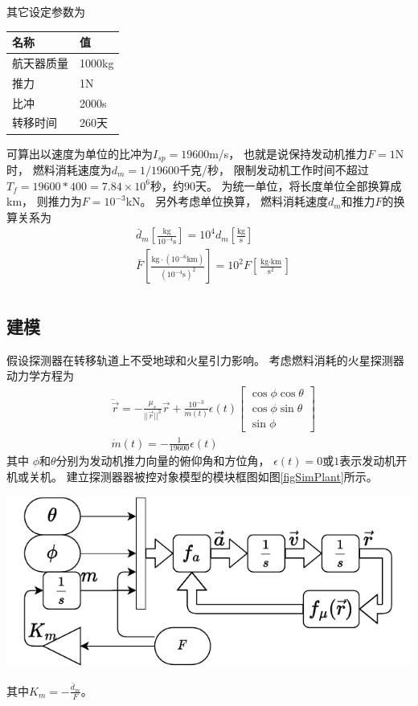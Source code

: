 其它设定参数为
\begin{center}\begin{tabular}{ll}
    \toprule
    名称 & 值 \\
    \midrule
    航天器质量 & 1000kg \\
    推力 & 1N \\
    比冲 & 2000s \\
    转移时间 & 260天 \\
    \bottomrule
\end{tabular}\end{center}
可算出以速度为单位的比冲为$I_{sp}=19600$m/s，
也就是说保持发动机推力$F=1$N时，
燃料消耗速度为$d_m=1/19600$千克/秒，
限制发动机工作时间不超过$T_f=19600*400=7.84\times10^6$秒，约90天。
为统一单位，将长度单位全部换算成km，
则推力为$F=10^{-3}$kN。
另外考虑单位换算，
燃料消耗速度$d_m$和推力$F$的换算关系为
\begin{align*}
    &\bar{d}_m\left[\frac{\text{kg}}{10^{-4}\text{s}}\right]
    = 10^4d_m\left[\frac{\text{kg}}{\text{s}}\right] \\
    &\bar{F}\left[\frac{\text{kg}\cdot(10^{-6}\text{km})}{(10^{-4}\text{s})^2}\right]
    = 10^2F\left[\frac{\text{kg}\cdot\text{km}}{\text{s}^2}\right] \\
\end{align*}

\subsection{建模}
假设探测器在转移轨道上不受地球和火星引力影响。
考虑燃料消耗的火星探测器动力学方程为
\begin{align*}
    &\ddot{\vec{r}} = -\frac{\mu_s}{||\vec{r}||^3}\vec{r}
    + \frac{10^{-3}}{m(t)}\epsilon(t)
    \left[\begin{matrix}
        \cos\phi\cos\theta \\ \cos\phi\sin\theta \\ \sin\phi
    \end{matrix}\right] \\
    &\dot{m}(t) = -\frac{1}{19600}\epsilon(t)
\end{align*}
其中
$\phi$和$\theta$分别为发动机推力向量的俯仰角和方位角，
$\epsilon(t)=0$或$1$表示发动机开机或关机。
建立探测器器被控对象模型的模块框图如图\ref{figSimPlant}所示。
\begin{center}
	\includegraphics[scale=0.8]{plant.pdf}  \\
	\label{figSimPlant}
\end{center}
其中$K_m=-\frac{\bar{d}_m}{F}$。

